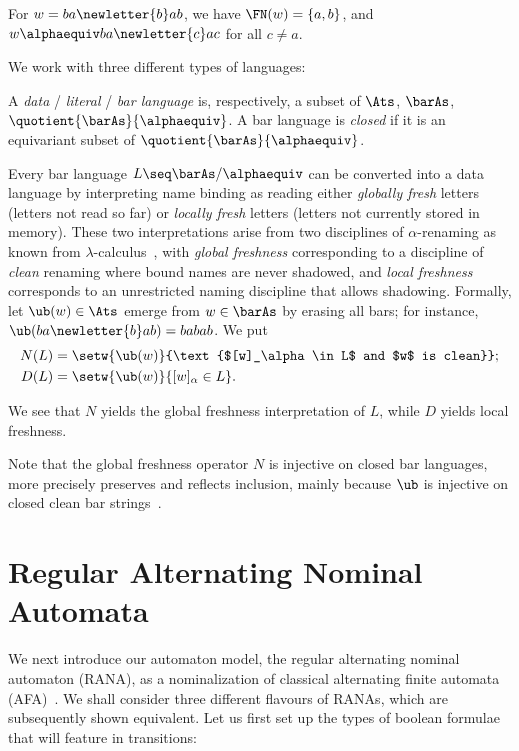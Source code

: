 \documentclass[10pt, final, conference, a4paper, twocolumn]{IEEEtran}
\begin{document}
\begin{example} For $w = ba\newletter{b}ab$, we have $\FN(w)=\{a,b\}$, and $w \alphaequiv ba\newletter{c}ac$ for all $c\neq a$.
\end{example}
 We work with three different types of languages:

\begin{defn} A \emph{data} / \emph{literal} / \emph{bar language} is, respectively, a subset of $\Ats$, $\barAs$, $\quotient{\barAs}{\alphaequiv}$.
    A bar language is \emph{closed} if it is an equivariant subset of $\quotient{\barAs}{\alphaequiv}$. 
\end{defn}
Every bar language $L \seq \barAs/{\alphaequiv}$ can be converted into a data language by interpreting name binding as reading either \emph{globally fresh} letters (letters not read so far) or \emph{locally fresh} letters (letters not currently stored in memory).
These two interpretations arise from two disciplines of $\alpha$-renaming as known from $\lambda$-calculus~\cite{barendregt85}, with \emph{global freshness} corresponding to a discipline of \emph{clean} renaming where bound names are never shadowed, and \emph{local freshness} corresponds to an unrestricted naming discipline that allows shadowing. Formally, let $\ub(w)\in \Ats$ emerge from $w\in \barAs$ by erasing all bars; for instance, $\ub(ba\newletter{b}ab)=babab$. We put
\begin{equation}
  \begin{aligned}
    N(L) & = \setw{\ub(w)}{\text{$[w]_\alpha \in L$ and $w$ is
    clean}}; \\
    D(L) & = \setw{\ub(w)}{[w]_\alpha \in L}.
  \end{aligned}\label{eq:ND}
\end{equation}

We see that $N$ yields the global freshness interpretation of $L$, while $D$ yields local freshness.

Note that the global freshness operator $N$ is injective on closed bar
languages, more precisely preserves and reflects inclusion, mainly
because $\ub$ is injective on closed clean bar
strings~\cite[Lemma~A.3]{skmw17}.


\section{Regular Alternating Nominal Automata}\label{sec:rana}
We next introduce our automaton model, the regular alternating nominal automaton (RANA),
as a nominalization of classical alternating finite automata (AFA)~\cite{cks81}. %
We shall consider three different flavours of RANAs, which are subsequently shown equivalent. 
Let us first set up the types of boolean formulae that will feature in transitions:
\end{document}
